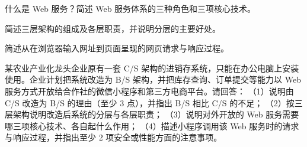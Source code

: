 \documentclass[a4paper,11pt]{article}
\begin{document}
\q 什么是 Web 服务？简述 Web 服务体系的三种角色和三项核心技术。\anslines{2.4cm}

\q 简述三层架构的组成及各层职责，并说明分层的主要好处。\anslines{2.4cm}

\q 简述从在浏览器输入网址到页面呈现的网页请求与响应过程。\anslines{2.4cm}

\newpage
{}
\q 某农业产业化龙头企业原有一套 C/S 架构的进销存系统，只能在办公电脑上安装使用。企业计划把系统改造为 B/S 架构，并把库存查询、订单提交等能力以 Web 服务方式开放给合作社的微信小程序和第三方电商平台。请回答：
（1）说明由 C/S 改造为 B/S 的理由（至少 3 点），并指出 B/S 相比 C/S 的不足；
（2）按三层架构说明改造后系统的分层与各层职责；
（3）说明对外开放的 Web 服务需要哪三项核心技术、各自起什么作用；
（4）描述小程序调用该 Web 服务时的请求与响应过程，并指出至少 2 项安全或性能方面的注意事项。\anslines{5cm}
\end{document}
